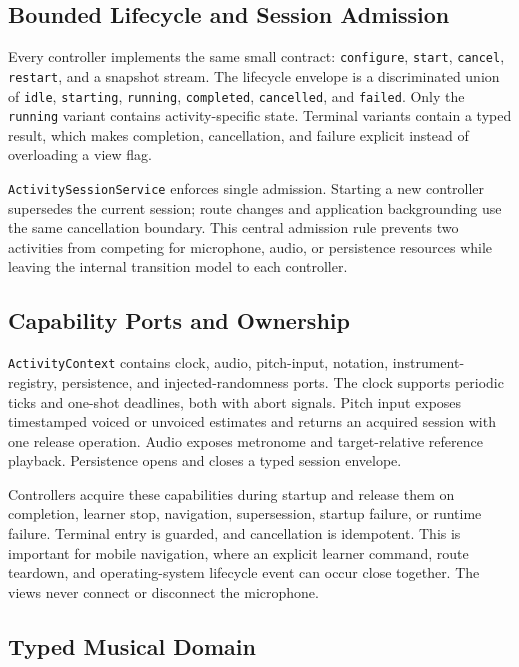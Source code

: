 \documentclass[runningheads]{llncs}
\begin{document}
\subsection{Bounded Lifecycle and Session Admission}

Every controller implements the same small contract:
\texttt{configure}, \texttt{start}, \texttt{cancel}, \texttt{restart}, and a
snapshot stream. The lifecycle envelope is a discriminated union of
\texttt{idle}, \texttt{starting}, \texttt{running}, \texttt{completed},
\texttt{cancelled}, and \texttt{failed}. Only the \texttt{running} variant
contains activity-specific state. Terminal variants contain a typed result,
which makes completion, cancellation, and failure explicit instead of
overloading a view flag.

\texttt{ActivitySessionService} enforces single admission. Starting a new
controller supersedes the current session; route changes and application
backgrounding use the same cancellation boundary. This central admission rule
prevents two activities from competing for microphone, audio, or persistence
resources while leaving the internal transition model to each controller.

\subsection{Capability Ports and Ownership}

\texttt{ActivityContext} contains clock, audio, pitch-input, notation,
instrument-registry, persistence, and injected-randomness ports. The clock
supports periodic ticks and one-shot deadlines, both with abort signals.
Pitch input exposes timestamped voiced or unvoiced estimates and returns an
acquired session with one release operation. Audio exposes metronome and
target-relative reference playback. Persistence opens and closes a typed
session envelope.

Controllers acquire these capabilities during startup and release them on
completion, learner stop, navigation, supersession, startup failure, or runtime
failure. Terminal entry is guarded, and cancellation is idempotent. This is
important for mobile navigation, where an explicit learner command, route
teardown, and operating-system lifecycle event can occur close together. The
views never connect or disconnect the microphone.

\subsection{Typed Musical Domain}
\end{document}
